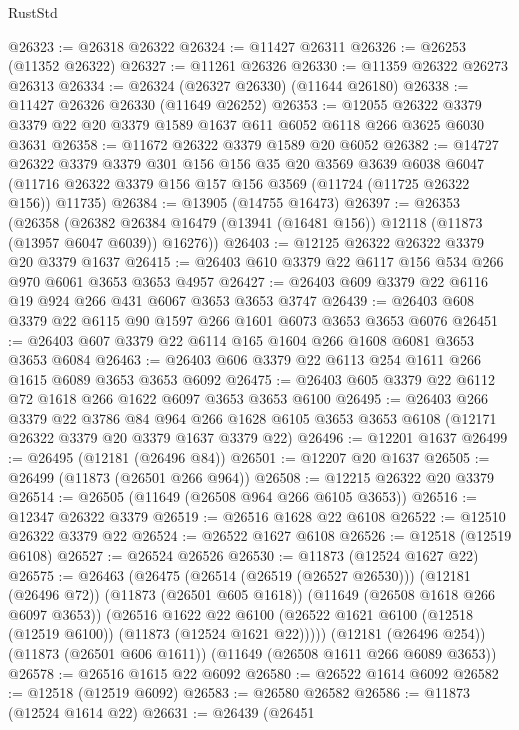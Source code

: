 \begin{lexlean}{RustStd}
\begin{coremodule}
@26323 := @26318 @26322
@26324 := @11427 @26311
@26326 := @26253 (@11352 @26322)
@26327 := @11261 @26326
@26330 := @11359 @26322 @26273 @26313
@26334 := @26324 (@26327 @26330) (@11644 @26180)
@26338 := @11427 @26326 @26330 (@11649 @26252)
@26353 := @12055
    @26322
    @3379
    @3379
    @22
    @20
    @3379
    @1589
    @1637
    @611
    @6052
    @6118
    @266
    @3625
    @6030
    @3631
@26358 := @11672 @26322 @3379 @1589 @20 @6052
@26382 := @14727
    @26322
    @3379
    @3379
    @301
    @156
    @156
    @35
    @20
    @3569
    @3639
    @6038
    @6047
    (@11716 @26322 @3379 @156 @157 @156 @3569 (@11724 (@11725 @26322 @156)) @11735)
@26384 := @13905 (@14755 @16473)
@26397 := @26353
    (@26358
      (@26382 @26384 @16479 (@13941 (@16481 @156)) @12118 (@11873 (@13957 @6047 @6039)) @16276))
@26403 := @12125 @26322 @26322 @3379 @20 @3379 @1637
@26415 := @26403 @610 @3379 @22 @6117 @156 @534 @266 @970 @6061 @3653 @3653 @4957
@26427 := @26403 @609 @3379 @22 @6116 @19 @924 @266 @431 @6067 @3653 @3653 @3747
@26439 := @26403 @608 @3379 @22 @6115 @90 @1597 @266 @1601 @6073 @3653 @3653 @6076
@26451 := @26403 @607 @3379 @22 @6114 @165 @1604 @266 @1608 @6081 @3653 @3653 @6084
@26463 := @26403 @606 @3379 @22 @6113 @254 @1611 @266 @1615 @6089 @3653 @3653 @6092
@26475 := @26403 @605 @3379 @22 @6112 @72 @1618 @266 @1622 @6097 @3653 @3653 @6100
@26495 := @26403
    @266
    @3379
    @22
    @3786
    @84
    @964
    @266
    @1628
    @6105
    @3653
    @3653
    @6108
    (@12171 @26322 @3379 @20 @3379 @1637 @3379 @22)
@26496 := @12201 @1637
@26499 := @26495 (@12181 (@26496 @84))
@26501 := @12207 @20 @1637
@26505 := @26499 (@11873 (@26501 @266 @964))
@26508 := @12215 @26322 @20 @3379
@26514 := @26505 (@11649 (@26508 @964 @266 @6105 @3653))
@26516 := @12347 @26322 @3379
@26519 := @26516 @1628 @22 @6108
@26522 := @12510 @26322 @3379 @22
@26524 := @26522 @1627 @6108
@26526 := @12518 (@12519 @6108)
@26527 := @26524 @26526
@26530 := @11873 (@12524 @1627 @22)
@26575 := @26463
    (@26475
      (@26514 (@26519 (@26527 @26530)))
      (@12181 (@26496 @72))
      (@11873 (@26501 @605 @1618))
      (@11649 (@26508 @1618 @266 @6097 @3653))
      (@26516
        @1622
        @22
        @6100
        (@26522 @1621 @6100 (@12518 (@12519 @6100)) (@11873 (@12524 @1621 @22)))))
    (@12181 (@26496 @254))
    (@11873 (@26501 @606 @1611))
    (@11649 (@26508 @1611 @266 @6089 @3653))
@26578 := @26516 @1615 @22 @6092
@26580 := @26522 @1614 @6092
@26582 := @12518 (@12519 @6092)
@26583 := @26580 @26582
@26586 := @11873 (@12524 @1614 @22)
@26631 := @26439
    (@26451

\end{coremodule}
\end{lexlean}
